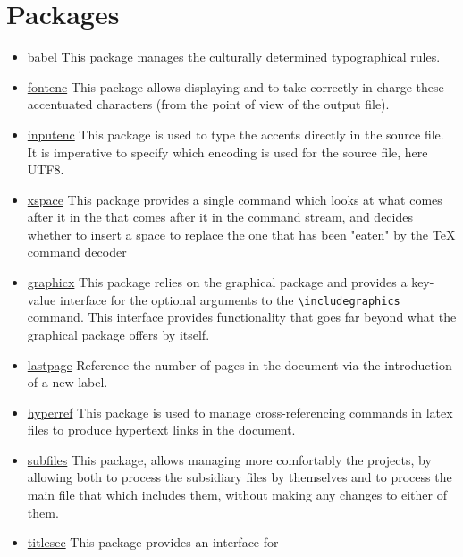 \section{Packages}

\begin{itemize}
    \item \href{https://www.ctan.org/pkg/babel}{babel} This package manages the culturally
          determined typographical rules.
    \item \href{https://ctan.org/pkg/fontenc}{fontenc} This package allows displaying and
          to take correctly in charge these accentuated characters (from the point of view of the
          output file).
    \item \href{https://www.ctan.org/pkg/inputenc}{inputenc} This package is used to type the
          accents directly in the source file. It is imperative to specify which encoding is used
          for the source file, here UTF8.
    \item \href{https://www.ctan.org/pkg/inputenc}{xspace} This package provides a single command
          which looks at what comes after it in the that comes after it in the command stream, and
          decides whether to insert a space to replace the one that has been "eaten" by the TeX
          command decoder
    \item \href{https://www.ctan.org/pkg/graphicx}{graphicx} This package relies on
          the graphical package and provides a key-value interface for the optional arguments to the
          \verb=\includegraphics= command. This interface provides functionality that goes far
          beyond what the graphical package offers by itself.
    \item \href{https://www.ctan.org/pkg/lastpage}{lastpage} Reference the number of pages in the
          document via the introduction of a new label.
    \item \href{https://www.ctan.org/pkg/hyperref}{hyperref} This package is used
          to manage cross-referencing commands in \gls{latex} files to produce hypertext links in
          the document.
    \item \href{https://www.ctan.org/pkg/subfiles}{subfiles} This package, allows managing more
          comfortably the projects, by allowing both to process the subsidiary files by themselves
          and to process the main file that which includes them, without making any changes to
          either of them.
    \item \href{https://www.ctan.org/pkg/titlesec}{titlesec} This package provides an interface for

\end{itemize}
